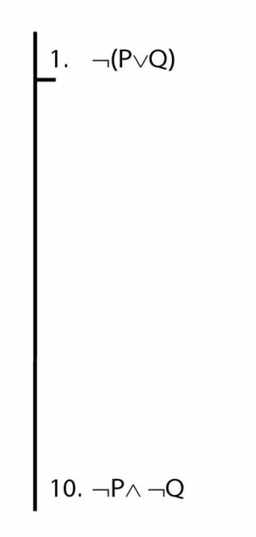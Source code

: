 \documentclass[12pt]{extarticle}
\begin{document}
\begin{multicols*}{3}
\begin{center}
\includegraphics[scale=0.3]{img/unit_821_proof.png}
\end{center}
\begin{center}

\end{center}
\end{multicols*}
\end{document}
